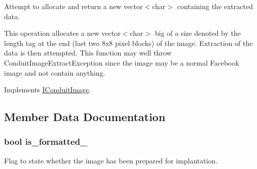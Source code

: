 Attempt to allocate and return a new vector$<$char$>$ containing the extracted data. 

This operation allocates a new vector$<$char$>$ big of a size denoted by the length tag at the end (last two 8x8 pixel blocks) of the image. Extraction of the data is then attempted. This function may well throw ConduitImageExtractException since the image may be a normal Facebook image and not contain anything. 

Implements \hyperlink{classefb_1_1IConduitImage_a920c1ba3f4f8d7531a8b6f8c8b38def6}{IConduitImage}.



\subsection{Member Data Documentation}
\hypertarget{classefb_1_1HaarConduitImage_aba28e7654a4ce9835d571c3daaebc43c}{
\subsubsection[{is\_\-formatted\_\-}]{\setlength{\rightskip}{0pt plus 5cm}bool {\bf is\_\-formatted\_\-}}}
\label{classefb_1_1HaarConduitImage_aba28e7654a4ce9835d571c3daaebc43c}


Flag to state whether the image has been prepared for implantation. 

